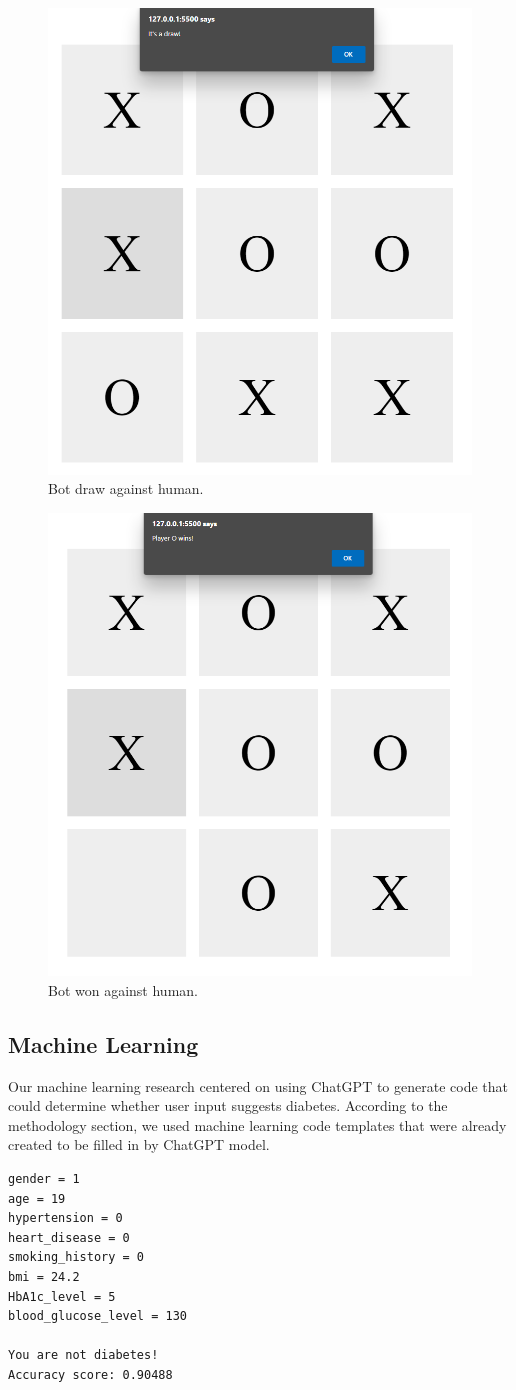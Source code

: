 \documentclass[conference]{IEEEtran}
\begin{document}



\vspace{-5pt}

\begin{figure}[H]
\centerline{\includegraphics[width=0.3\linewidth]{Simple Application/draw.png}}
\caption{Bot draw against human.}
\label{simple app draw}
\end{figure}

\vspace{-10pt}

\begin{figure}[H]
\centerline{\includegraphics[width=0.3\linewidth]{Simple Application/won.png}}
\caption{Bot won against human.}
\label{simple app won}
\end{figure}

\subsection{Machine Learning}
Our machine learning research centered on using ChatGPT to generate code that could determine whether user input suggests diabetes. According to the methodology section, we used machine learning code templates that were already created to be filled in by ChatGPT model.



\begin{lstlisting}[caption={Given Input \& ChatGPT Diabetes Result}, basicstyle=\scriptsize\ttfamily]
gender = 1
age = 19
hypertension = 0
heart_disease = 0
smoking_history = 0
bmi = 24.2
HbA1c_level = 5
blood_glucose_level = 130

You are not diabetes!
Accuracy score: 0.90488
\end{lstlisting}
\end{document}
